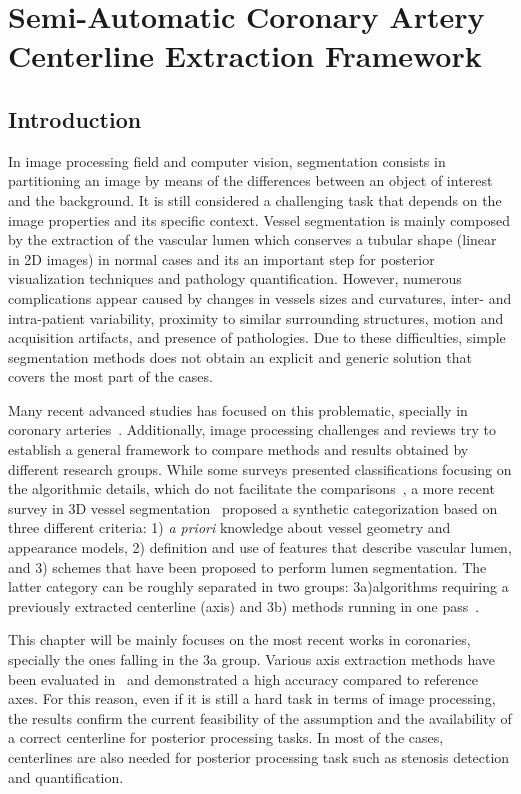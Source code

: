 \chapter{Semi-Automatic Coronary Artery Centerline Extraction Framework}
%

\section{Introduction}
%
In image processing field and computer vision, segmentation consists in partitioning an image by means of the differences between an object of interest and the background. It is still considered a challenging task that depends on the image properties and its specific context. Vessel segmentation is mainly composed by the extraction of the vascular lumen which conserves a tubular shape (linear in 2D images) in normal cases and its an important step for posterior visualization techniques and pathology quantification. However, numerous complications appear caused by changes in vessels sizes and curvatures, inter- and intra-patient variability, proximity to similar surrounding structures, motion and acquisition artifacts, and presence of pathologies. Due to these difficulties, simple segmentation methods does not obtain an explicit and generic solution that covers the most part of the cases.

Many recent advanced studies has focused on this problematic, specially in coronary arteries~\citep{Lesage2009Thesis, Schaap2010Thesis, Wang2011Thesis, Zuluaga2011Thesis}. Additionally, image processing challenges and reviews try to establish a general framework to compare methods and results obtained by different research groups. While some surveys presented classifications focusing on the algorithmic details, which do not facilitate the comparisons~\citep{Kirbas2004}, a more recent survey in 3D vessel segmentation~\citep{Lesage2009b} proposed a synthetic categorization based on three different criteria: 1) \textit{a priori} knowledge about vessel geometry and appearance models, 2) definition and use of features that describe vascular lumen, and 3) schemes that have been proposed to perform lumen segmentation. The latter category can be roughly separated in two groups: 3a)algorithms requiring a previously extracted centerline (axis) and 3b) methods running in one pass~\citep{Schaap2011}.

This chapter will be mainly focuses on the most recent works in coronaries, specially the ones falling in the 3a group. Various axis extraction methods have been evaluated in~\citep{Metz2008} and demonstrated a high accuracy compared to reference axes. For this reason, even if it is still a hard task in terms of image processing, the results confirm the current feasibility of the assumption and the availability of a correct centerline for posterior processing tasks. In most of the cases, centerlines are also needed for posterior processing task such as stenosis detection and quantification.

